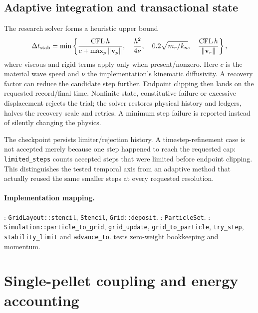 \subsection{Adaptive integration and transactional state}
The research solver forms a heuristic upper bound
\begin{equation}
 \Delta t_{\rm stab}=\min\left\{
 \frac{\mathrm{CFL}\,h}{c+\max_p\|\mathbf{v}_p\|},\quad
 \frac{h^2}{4\nu},\quad 0.2\sqrt{m_r/k_n},\quad
 \frac{\mathrm{CFL}\,h}{\|\mathbf{v}_r\|}\right\}, \label{eq:mpm-step}
\end{equation}
where viscous and rigid terms apply only when present/nonzero. Here $c$ is the
material wave speed and $\nu$ the implementation's kinematic diffusivity.
A recovery factor can reduce the candidate step further. Endpoint clipping
then lands on the requested record/final time. Nonfinite state, constitutive
failure or excessive displacement rejects the trial; the solver restores
physical history and ledgers, halves the recovery scale and retries. A minimum
step failure is reported instead of silently changing the physics.

The checkpoint persists limiter/rejection history. A timestep-refinement case
is not accepted merely because one step happened to reach the requested cap:
\nolinkurl{limited_steps} counts accepted steps that were limited before endpoint
clipping. This distinguishes the tested temporal axis from an adaptive method
that actually reused the same smaller steps at every requested resolution.

\paragraph{Implementation mapping.}
: \nolinkurl{GridLayout::stencil}, \nolinkurl{Stencil},
\nolinkurl{Grid::deposit}. : \nolinkurl{ParticleSet}.
: \nolinkurl{Simulation::particle_to_grid},
\nolinkurl{grid_update}, \nolinkurl{grid_to_particle}, \nolinkurl{try_step},
\nolinkurl{stability_limit} and \nolinkurl{advance_to}.
 tests zero-weight bookkeeping and momentum.

\section{Single-pellet coupling and energy accounting}
\label{sec:coupling}
